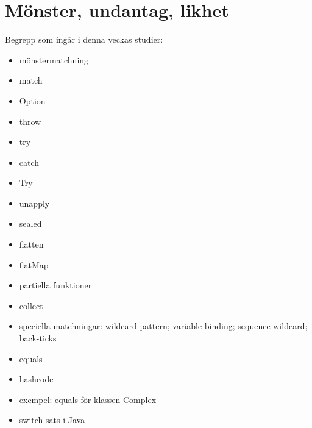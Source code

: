 \chapter{Mönster, undantag, likhet}\label{chapter:W10}
Begrepp som ingår i denna veckas studier:
\begin{itemize}[noitemsep,label={$\square$},leftmargin=*]
\item mönstermatchning
\item match
\item Option
\item throw
\item try
\item catch
\item Try
\item unapply
\item sealed
\item flatten
\item flatMap
\item partiella funktioner
\item collect
\item speciella matchningar: wildcard pattern; variable binding; sequence wildcard; back-ticks
\item equals
\item hashcode
\item exempel: equals för klassen Complex
\item switch-sats i Java\end{itemize}
